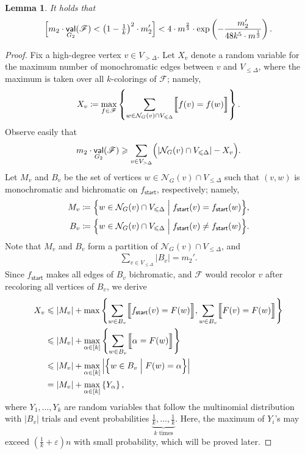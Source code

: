 \documentclass[11pt,fleqn]{article}
\renewcommand{\geq}{\geqslant}
\renewcommand{\leq}{\leqslant}
\renewcommand{\epsilon}{\varepsilon}
\newcommand{\defeq}{\coloneq}
\DeclareMathOperator{\val}{\mathsf{val}}
\newcommand{\nei}{\calN}
\newcommand{\sss}{\mathsf{start}}
\newcommand{\f}{f}
\newcommand{\frnd}{F}
\newcommand{\sqcol}{\scrF}
\newcommand{\Vl}{V_{\leq \Delta}}
\newcommand{\Vg}{V_{> \Delta}}
\newcommand{\calN}{\mathcal{N}}
\newcommand{\scrF}{\mathscr{F}}
\let\Pr\relax\DeclareMathOperator*{\Pr}{\mathbb{P}}
\newtheorem{lemma}[theorem]{Lemma}
\theoremstyle{definition}
\numberwithin{equation}{section}
\begin{document}
\begin{lemma}
\label{lem:Cut-alg:high-degree}
It holds that
\begin{align}
    \Pr\Bigl[
        m_2 \cdot \val_{G_2}(\sqcol)
        < \left(1-\tfrac{1}{k}\right)^2 \cdot m_2'
    \Bigr]
    < 4 \cdot m^{\frac{2}{3}} \cdot \exp\left(
        -\frac{m_2'}{48 k^5 \cdot m^\frac{1}{3}}
    \right).
\end{align}
\end{lemma}
\begin{proof} Fix a high-degree vertex $v \in \Vg$.
Let $X_v$ denote a random variable for
the maximum number of monochromatic edges
between $v$ and $\Vl$, where
the maximum is taken over all $k$-colorings of $\sqcol$; namely,
\begin{align}
    X_v \defeq \max_{\f \in \sqcol} \left\{
        \sum_{w \in \nei_G(v) \cap \Vl}
        \Bigl\llbracket \f(v) = \f(w) \Bigr\rrbracket
    \right\}.
\end{align}
Observe easily that
\begin{align}
    m_2 \cdot \val_{G_2}(\sqcol)
    \geq \sum_{v \in \Vg} \Bigl(
        |\nei_G(v) \cap \Vl| - X_v
    \Bigr).
\end{align}
Let $M_v$ and $B_v$ be the set of vertices $w \in \nei_G(v) \cap \Vl$
such that $(v,w)$ is monochromatic and bichromatic on $\f_\sss$,
respectively; namely,
\begin{align}
    M_v & \defeq \Bigl\{ w \in \nei_G(v) \cap \Vl \Bigm| \f_\sss(v) = \f_\sss(w) \Bigr\}, \\
    B_v & \defeq \Bigl\{ w \in \nei_G(v) \cap \Vl \Bigm| \f_\sss(v) \neq \f_\sss(w) \Bigr\}.
\end{align}
Note that $M_v$ and $B_v$ form a partition of $\nei_G(v) \cap \Vl$, and
\begin{align}
    \sum_{v \in \Vl} |B_v| = m_2'.
\end{align}
Since $\f_\sss$ makes all edges of $B_v$ bichromatic, and
$\sqcol$ would recolor $v$ after recoloring all vertices of $B_v$,
we derive
\begin{align}
\begin{aligned}
    X_v & \leq |M_v| + \max\left\{
        \sum_{w \in B_v} \Bigl\llbracket \f_\sss(v) = \frnd(w) \Bigr\rrbracket,
        \sum_{w \in B_v} \Bigl\llbracket \frnd(v) = \frnd(w) \Bigr\rrbracket
    \right\} \\
    & \leq |M_v| +
        \max_{\alpha \in [k]} \left\{
            \sum_{w \in B_v} \Bigl\llbracket \alpha = \frnd(w) \Bigr\rrbracket
        \right\} \\
    & \leq |M_v| +
        \max_{\alpha \in [k]} \left|\Bigl\{
            w \in B_v \Bigm| \frnd(w) = \alpha
        \Bigr\}\right| \\
    & = |M_v| +
        \max_{\alpha \in [k]} \left\{Y_\alpha\right\},
\end{aligned}
\end{align}
where $Y_1, \ldots, Y_k$ are random variables that follow the multinomial distribution
with $|B_v|$ trials and event probabilities
$\underbrace{\tfrac{1}{k}, \ldots, \tfrac{1}{k}}_{k \text{ times}}$.
Here, the maximum of $Y_i$'s may exceed
$\left(\frac{1}{k}+\epsilon\right)n$ with small probability,
which will be proved later.


\end{proof}
\end{document}
